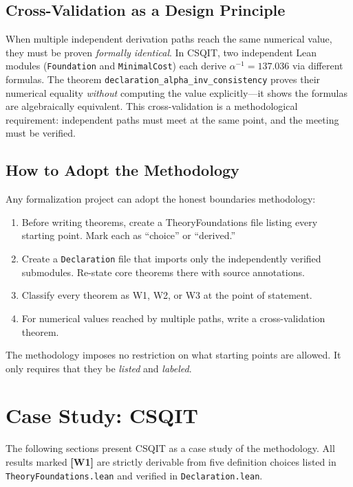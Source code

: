 ﻿\documentclass[11pt]{article}
\newcommand{\wone}[1]{\textcolor{wcolor}{\textbf{[#1]}}}
\begin{document}
\subsection{Cross-Validation as a Design Principle}
When multiple independent derivation paths reach the same
numerical value, they must be proven \emph{formally identical}.
In CSQIT, two independent Lean modules (\texttt{Foundation} and
\texttt{MinimalCost}) each derive $\alpha^{-1} = 137.036$ via
different formulas. The theorem
\texttt{declaration\_alpha\_inv\_consistency} proves their
numerical equality \emph{without} computing the value
explicitly---it shows the formulas are algebraically equivalent.
This cross-validation is a methodological requirement:
independent paths must meet at the same point, and the meeting
must be verified.

\subsection{How to Adopt the Methodology}
Any formalization project can adopt the honest boundaries
methodology:
\begin{enumerate}
\item Before writing theorems, create a TheoryFoundations file
  listing every starting point. Mark each as ``choice'' or
  ``derived.''
\item Create a \texttt{Declaration} file that imports only
  the independently verified submodules. Re-state core
  theorems there with source annotations.
\item Classify every theorem as W1, W2, or W3 at the point of
  statement.
\item For numerical values reached by multiple paths, write a
  cross-validation theorem.
\end{enumerate}
The methodology imposes no restriction on what starting points
are allowed. It only requires that they be \emph{listed} and
\emph{labeled}.

\section*{Case Study: CSQIT}
\label{sec:casestudy}

The following sections present CSQIT as a case study of the
methodology. All results marked \wone{W1} are strictly derivable
from five definition choices listed in
\texttt{TheoryFoundations.lean} and verified in
\texttt{Declaration.lean}.
\end{document}
